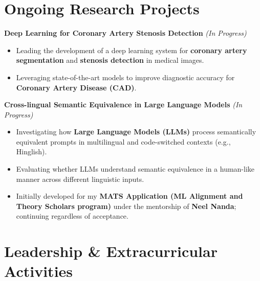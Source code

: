 \documentclass[10pt, letterpaper]{article}
\begin{document}
\section{Ongoing Research Projects}

\textbf{Deep Learning for Coronary Artery Stenosis Detection} \textit{(In Progress)} \\
\begin{itemize}
    \item Leading the development of a deep learning system for \textbf{coronary artery segmentation} and \textbf{stenosis detection} in medical images.
    \item Leveraging state-of-the-art models to improve diagnostic accuracy for \textbf{Coronary Artery Disease (CAD)}.
\end{itemize}

\textbf{Cross-lingual Semantic Equivalence in Large Language Models} \textit{(In Progress)} \\
\begin{itemize}
    \item Investigating how \textbf{Large Language Models (LLMs)} process semantically equivalent prompts in multilingual and code-switched contexts (e.g., Hinglish).
    \item Evaluating whether LLMs understand semantic equivalence in a human-like manner across different linguistic inputs.
    \item Initially developed for my \textbf{MATS Application (ML Alignment and Theory Scholars program)} under the mentorship of \textbf{Neel Nanda}; continuing regardless of acceptance.
\end{itemize}

\section{Leadership \& Extracurricular Activities}
\end{document}

